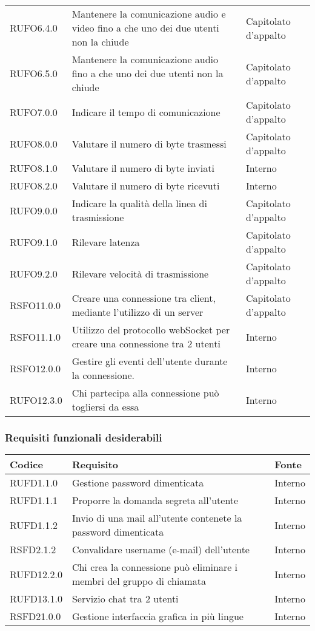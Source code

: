 \begin{center}
\begin{longtable}{lp{}l}
RUFO6.4.0 & Mantenere la comunicazione audio e video fino a che uno dei due utenti non la chiude & Capitolato d'appalto \\
RUFO6.5.0 & Mantenere la comunicazione audio fino a che uno dei due utenti non la chiude & Capitolato d'appalto \\
RUFO7.0.0 & Indicare il tempo di comunicazione & Capitolato d'appalto \\
RUFO8.0.0 & Valutare il numero di byte trasmessi & Capitolato d'appalto \\
RUFO8.1.0 & Valutare il numero di byte inviati & Interno \\
RUFO8.2.0 & Valutare il numero di byte ricevuti & Interno \\
RUFO9.0.0 & Indicare la qualità della linea di trasmissione & Capitolato d'appalto \\
RUFO9.1.0 & Rilevare latenza & Capitolato d'appalto \\
RUFO9.2.0 & Rilevare velocità di trasmissione & Capitolato d'appalto \\
RSFO11.0.0 & Creare una connessione tra client, mediante l'utilizzo di un server & Capitolato d'appalto \\
RSFO11.1.0 & Utilizzo del protocollo webSocket per creare una connessione tra 2 utenti & Interno \\
RSFO12.0.0 & Gestire gli eventi dell'utente durante la connessione. & Interno \\
RUFO12.3.0 & Chi partecipa alla connessione può togliersi da essa & Interno \\
\bottomrule
\end{longtable}
\end{center}

\subsubsection{Requisiti funzionali desiderabili}

\begin{center}
\begin{longtable}{lp{}l}
\toprule Codice & Requisito & Fonte\\
\midrule
RUFD1.1.0 & Gestione password dimenticata & Interno \\
RUFD1.1.1 & Proporre la domanda segreta all'utente & Interno \\
RUFD1.1.2 & Invio di una mail all'utente contenete la password dimenticata & Interno \\
RSFD2.1.2 & Convalidare username (e-mail) dell'utente & Interno \\
RUFD12.2.0 & Chi crea la connessione può eliminare i membri del gruppo di chiamata & Interno \\
RUFD13.1.0 & Servizio chat tra 2 utenti & Interno \\
RSFD21.0.0 & Gestione interfaccia grafica in più lingue & Interno \\
\bottomrule
\end{longtable}
\end{center}


